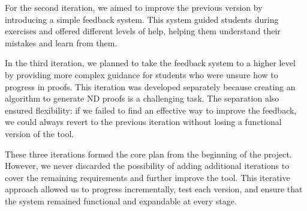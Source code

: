 For the second iteration, we aimed to improve the previous version by introducing a simple feedback system. This system guided students during exercises and offered different levels of help, helping them understand their mistakes and learn from them.

In the third iteration, we planned to take the feedback system to a higher level by providing more complex guidance for students who were unsure how to progress in proofs. This iteration was developed separately because creating an algorithm to generate \gls{ND} proofs is a challenging task. The separation also ensured flexibility: if we failed to find an effective way to improve the feedback, we could always revert to the previous iteration without losing a functional version of the tool.

These three iterations formed the core plan from the beginning of the project. However, we never discarded the possibility of adding additional iterations to cover the remaining requirements and further improve the tool. This iterative approach allowed us to progress incrementally, test each version, and ensure that the system remained functional and expandable at every stage.

